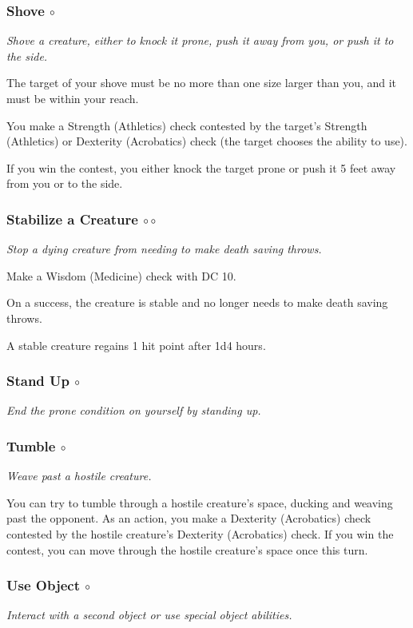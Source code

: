 \subsubsection{Shove $\circ$}
    \textit{Shove a creature, either to knock it prone, push it away from you, or push it to the side.}

    The target of your shove must be no more than one size larger than you, and it must be within your reach.

    You make a Strength (Athletics) check contested by the target's Strength (Athletics) or Dexterity (Acrobatics) check (the target chooses the ability to use).

    If you win the contest, you either knock the target prone or push it 5 feet away from you or to the side.

\subsubsection{Stabilize a Creature $\circ\circ$}
    \textit{Stop a dying creature from needing to make death saving throws.}

    Make a Wisdom (Medicine) check with DC 10.

    On a success, the creature is stable and no longer needs to make death saving throws.

    A stable creature regains 1 hit point after 1d4 hours.

\subsubsection{Stand Up $\circ$}
    \textit{End the prone condition on yourself by standing up.}

\subsubsection{Tumble $\circ$}
    \textit{Weave past a hostile creature.}

    You can try to tumble through a hostile creature's space, ducking and weaving past the opponent.
    As an action, you make a Dexterity (Acrobatics) check contested by the hostile creature's Dexterity (Acrobatics) check.
    If you win the contest, you can move through the hostile creature's space once this turn.

\subsubsection{Use Object $\circ$}
    \textit{Interact with a second object or use special object abilities.}


